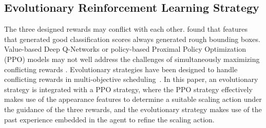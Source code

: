 \documentclass[letterpaper]{article} %
\def \eg {\emph{e.g.}}
\newcommand\red[1]{\textcolor{red}{#1}}
\newcommand\blue[1]{\textcolor{blue}{#1}}
\newcommand\purple[1]{\textcolor{purple}{#1}}
\newcommand\rjf[1]{\textcolor{red}{\{RJF: #1\}}}
\begin{document}

\subsection{Evolutionary Reinforcement Learning Strategy}
\label{ssec:EvoRLStrategy}
The three designed rewards may conflict with each other. %
\citet{jiang2018acquisition} found that features that generated good classification scores always generated rough bounding boxes. %
Value-based Deep Q-Networks \cite{song2023siamese} or policy-based Proximal Policy Optimization (PPO) models \cite{yi2023automated} may not well address the challenges of simultaneously maximizing conflicting rewards \cite{Hui_2023_EvoRLSurvey}. Evolutionary strategies have been designed to handle conflicting rewards in multi-objective scheduling~\cite{tu2023deep,chen2022cooperative}. In this paper, an evolutionary strategy is integrated with a PPO strategy, %
where the PPO strategy effectively makes use of the appearance features %
to determine a suitable scaling action under the guidance of the three rewards, and the evolutionary strategy makes use of the past experience embedded in the agent to refine the scaling action. %
\end{document}
